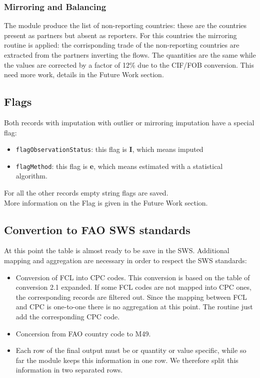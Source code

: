 \documentclass[nojss]{jss}\usepackage[]{graphicx}\usepackage[]{color}
\begin{document}
\subsubsection{Mirroring and Balancing}
The module produce the list of non-reporting countries: these are the countries present as partners but absent as reporters. For this countries the mirroring routine is applied: the corrisponding trade of the non-reporting countries are extracted from the partners inverting the flows. The quantities are the same while the values are corrected by a factor of 12\% due to the CIF/FOB conversion. This need more work, details in the Future Work section.\\

\subsection{Flags}
Both records with imputation with outlier or mirroring imputation have a special flag:
\begin{itemize}
\item {\tt flagObservationStatus}: this flag is {\bf I}, which means imputed
\item {\tt flagMethod}: this flag is {\bf e}, which means estimated with a statistical algorithm.
\end{itemize}
For all the other records empty string flags are saved.\\
More information on the Flag is given in the Future Work section.

\subsection{Convertion to FAO SWS standards}
At this point the table is almost ready to be save in the SWS. Additional mapping and aggregation are necessary in order to respect the SWS standards:
\begin{itemize}
\item Conversion of FCL into CPC codes. This conversion is based on the table of conversion 2.1 expanded. If some FCL codes are not mapped into CPC ones, the corresponding records are filtered out. Since the mapping between FCL and CPC is one-to-one there is no aggregation at this point. The routine just add the corresponding CPC code.
\item Concersion from FAO country code to M49.
\item Each row of the final output must be or quantity or value specific, while so far the module keeps this information in one row. We therefore split this information in two separated rows.
\end{itemize}
\end{document}
